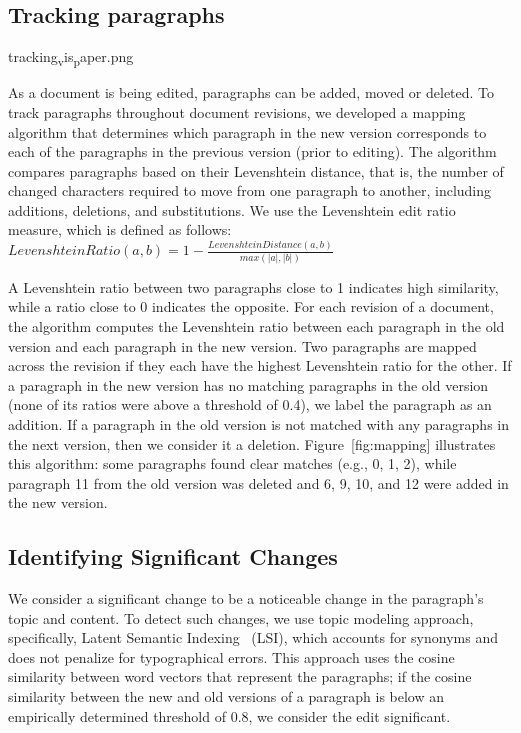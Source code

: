 \subsection{Tracking paragraphs}\label{tracking-paragraphs}

tracking\textsubscript{v}is\textsubscript{p}aper.png

As a document is being edited, paragraphs can be added, moved or
deleted. To track paragraphs throughout document revisions, we developed
a mapping algorithm that determines which paragraph in the new version
corresponds to each of the paragraphs in the previous version (prior to
editing). The algorithm compares paragraphs based on their Levenshtein
distance, that is, the number of changed characters required to move
from one paragraph to another, including additions, deletions, and
substitutions. We use the Levenshtein edit ratio measure, which is
defined as follows:
\(Levenshtein Ratio(a,b) = 1-\frac{Levenshtein Distance(a,b)}{max(|a|,|b|)} \)

A Levenshtein ratio between two paragraphs close to 1 indicates high
similarity, while a ratio close to 0 indicates the opposite. For each
revision of a document, the algorithm computes the Levenshtein ratio
between each paragraph in the old version and each paragraph in the new
version. Two paragraphs are mapped across the revision if they each have
the highest Levenshtein ratio for the other. If a paragraph in the new
version has no matching paragraphs in the old version (none of its
ratios were above a threshold of 0.4), we label the paragraph as an
addition. If a paragraph in the old version is not matched with any
paragraphs in the next version, then we consider it a deletion.
Figure~{[}fig:mapping{]} illustrates this algorithm: some paragraphs
found clear matches (e.g., 0, 1, 2), while paragraph 11 from the old
version was deleted and 6, 9, 10, and 12 were added in the new version.

\subsection{Identifying Significant
Changes}\label{identifying-significant-changes}

We consider a significant change to be a noticeable change in the
paragraph's topic and content. To detect such changes, we use topic
modeling approach, specifically, Latent Semantic
Indexing~\cite{deerwester1990indexing} (LSI), which accounts for
synonyms and does not penalize for typographical errors. This approach
uses the cosine similarity between word vectors that represent the
paragraphs; if the cosine similarity between the new and old versions of
a paragraph is below an empirically determined threshold of 0.8, we
consider the edit significant.

